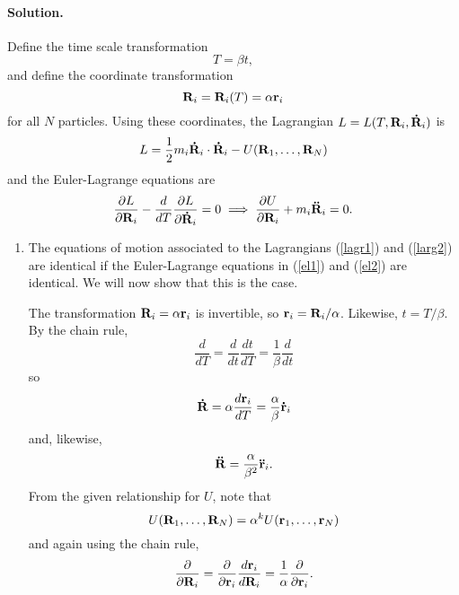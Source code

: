 \documentclass[11pt]{article}
\newcommand{\pder}[2]{\frac{\partial#1}{\partial#2}}
\newcommand{\der}[2]{\frac{d#1}{d#2}}
\newcommand{\refeq}[1]{(\ref{#1})}
\newenvironment{solution}
{
    \paragraph{Solution.}
    \ignorespaces
}
{
    \bigskip\bigskip
}
\begin{document}
\begin{enumerate}
\begin{solution}
		 Define the time scale transformation
		 \begin{equation}
		 	T = \beta t,
		\end{equation}
		and define the coordinate transformation
		\begin{equation}
			\mathbf{R}_i = \mathbf{R}_i(T) = \alpha \mathbf{r}_i
		\end{equation}
		for all $N$ particles.  Using these coordinates, the Lagrangian $L = L(T, \mathbf{R}_i, \mathbf{\dot{R}}_i)$ is
		\begin{equation} \label{lagr2}
			L = \frac{1}{2} m_i \mathbf{\dot{R}}_i \cdot \mathbf{\dot{R}}_i - U(\mathbf{R}_1, \ldots, \mathbf{R}_N)
		\end{equation}
		and the Euler-Lagrange equations are
		\begin{equation} \label{el2}
			\pder{L}{\vR_i} - \der{}{T} \pder{L}{\vRd_i} = 0 \implies \pder{U}{\vR_i} + m_i \vRdd_i = 0.
		\end{equation}
		
		\begin{enumerate}
			\item The equations of motion associated to the Lagrangians \refeq{lagr1} and \refeq{larg2} are identical if the Euler-Lagrange equations in \refeq{el1} and \refeq{el2} are identical.  We will now show that this is the case.
			
			The transformation $\mathbf{R}_i = \alpha \mathbf{r}_i$ is invertible, so $\mathbf{r}_i = \mathbf{R}_i / \alpha$.  Likewise, $t = T / \beta$.  By the chain rule,
			\begin{equation} \label{transT}
				\der{}{T} = \der{}{t} \der{t}{T} = \frac{1}{\beta} \der{}{t}
			\end{equation}
			so
			\begin{equation}
				\vRd = \alpha \der{\vr_i}{T} = \frac{\alpha}{\beta} \vrd_i
			\end{equation}
			and, likewise,
			\begin{equation} \label{secondder}
				\mathbf{\ddot{R}} = \frac{\alpha}{\beta^2} \mathbf{\ddot{r}}_i.
			\end{equation}
			From the given relationship for $U$, note that
			\begin{equation} \label{urel}
				U(\mathbf{R}_1, \ldots, \mathbf{R}_N) = \alpha^k U(\mathbf{r}_1, \ldots, \mathbf{r}_N)
			\end{equation}
			and again using the chain rule,
			\begin{equation} \label{rpart}
				\pder{}{\vR_i} = \pder{}{\vr_i} \der{\vr_i}{\vR_i} = \frac{1}{\alpha} \pder{}{\vr_i}.
			\end{equation}
			

\end{enumerate}
\end{solution}
\end{enumerate}
\end{document}
